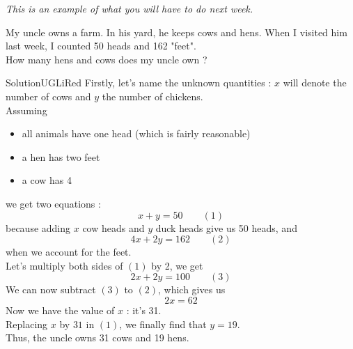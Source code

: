\documentclass[12pt,a4paper,article,firamath]{nsi}
\begin{document}
\maketitle

\begin{center}
    \textit{This is an example of what you will have to do next week.}
\end{center}

My uncle owns a farm. In his yard, he keeps cows and hens. When I visited him last week, I counted 50 heads and 162 "feet".\\
How many hens and cows does my uncle own ?

\begin{encadrecolore}{Solution}{UGLiRed}
    Firstly, let's name the unknown quantities : $x$ will denote the number of cows and $y$ the number of chickens.\\
    Assuming
    \begin{itemize}
        \item all animals have one head (which is fairly reasonable)
        \item a hen has two feet 
        \item a cow has 4
    \end{itemize}
    we get two equations : 
    $$x+y=50\qquad(1)$$
    because adding $x$ cow heads and $y$ duck heads give us 50 heads, and
    $$4x+2y = 162\qquad (2)$$
    when we account for the feet.\\
    Let's multiply both sides of $(1)$ by 2, we get $$2x+2y = 100\qquad (3)$$
    We can now subtract $(3)$ to $(2)$, which gives us
    $$2x = 62$$
    Now we have the value of $x$ : it's 31.\\
    Replacing $x$ by $31$ in $(1)$, we finally find that $y=19$.\\
    
    Thus, the uncle owns 31 cows and 19 hens.    
\end{encadrecolore}
\end{document}
